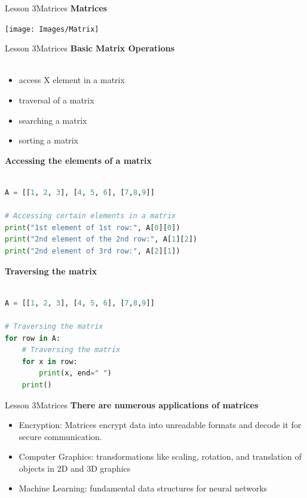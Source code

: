 \documentclass[aspectratio=1610]{beamer}
\begin{document}
\begin{frame}{Lesson 3}{Matrices}
\LARGE
\textbf{Matrices}
\begin{center}
\texttt{[image: Images/Matrix]}
\end{center}
\end{frame}


\begin{frame}{Lesson 3}{Matrices}
\LARGE
\textbf{Basic Matrix Operations}\\~\\
\begin{itemize}
	\item access X element in a matrix
	\item traversal of a matrix
	\item searching a matrix
	\item sorting a matrix
\end{itemize}
\end{frame}




\begin{frame}[fragile]
\LARGE
\textbf{Accessing the elements of a matrix}\\~\\
\Large
\begin{lstlisting}[language=Python]
A = [[1, 2, 3], [4, 5, 6], [7,8,9]]

# Accessing certain elements in a matrix
print("1st element of 1st row:", A[0][0])
print("2nd element of the 2nd row:", A[1][2])
print("2nd element of 3rd row:", A[2][1])
\end{lstlisting}
\end{frame}



\begin{frame}[fragile]
\LARGE
\textbf{Traversing the matrix}\\~\\
\Large
\begin{lstlisting}[language=Python]
A = [[1, 2, 3], [4, 5, 6], [7,8,9]]

# Traversing the matrix
for row in A:
    # Traversing the matrix
    for x in row:
        print(x, end=" ")
    print()
\end{lstlisting}
\end{frame}


\begin{frame}{Lesson 3}{Matrices}
\LARGE
\textbf{There are numerous applications of matrices}\\
\begin{itemize}
    \item Encryption: Matrices encrypt data into unreadable formats and decode it for secure communication. 
    \item Computer Graphics: transformations like scaling, rotation, and translation of objects in 2D and 3D graphics
    \item Machine Learning: fundamental data structures for neural networks  
\end{itemize}
\end{frame}
\end{document}
